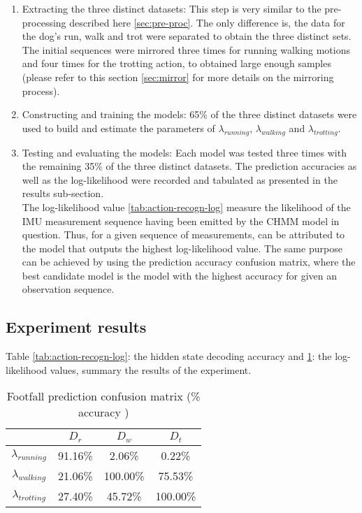 \begin{enumerate}
	\item Extracting the three distinct datasets: This step is very similar to the pre-processing described here \ref{sec:pre-proc}. The only difference is, the data for the dog's run, walk and trot were separated to obtain the three distinct sets. The initial sequences were mirrored three times for running walking motions and four times for the trotting action, to obtained large enough samples (please refer to this section \ref{sec:mirror} for more details on the mirroring process).
	
	\item Constructing and training the models: 65\% of the three distinct datasets were used to build and estimate the parameters of \(\lambda_{running}\), \(\lambda_{walking}\) and \(\lambda_{trotting}\).
	
	\item Testing and evaluating the models: Each model was tested three times with the remaining 35\% of the three distinct datasets. The prediction accuracies as well as the log-likelihood were recorded and tabulated as presented in the results sub-section.\\
	The log-likelihood value \ref{tab:action-recogn-log} measure the likelihood of the IMU measurement sequence having been emitted by the CHMM model in question.
	Thus, for a given sequence of measurements, can be attributed to the model that outputs the highest log-likelihood value. %
	The same purpose can be achieved by using the prediction accuracy confusion matrix, where the best candidate model is the model  with the highest accuracy for given an observation sequence.
\end{enumerate} 

\subsection{Experiment results}

Table \ref{tab:action-recogn-log}: the hidden state decoding accuracy and \ref{tab:action-recogn-acc}: the log-likelihood values, summary the results of the experiment.\\

\begin{table}[h!] 
	\centering
	\begin{tabular}{ |c|c|c|c|} 	
		\hline	
		& \(D_r\) &  \(D_w\) & \(D_t\)\\ 
		\hline
		\(\lambda_{running}\) & 91.16\% & 2.06\% & 0.22\% \\ 
		\hline
		\(\lambda_{walking}\) & 21.06\% & 100.00\% & 75.53\% \\ 
		\hline
		\(\lambda_{trotting}\) & 27.40\% & 45.72\% & 100.00\%\\
		\hline	   	
	\end{tabular}
	\caption{Footfall prediction confusion matrix (\% accuracy )}
	\label{tab:action-recogn-acc}
\end{table}


